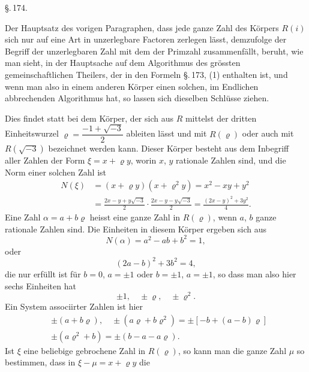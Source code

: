 
\begin{center}
\S.\,174.

\end{center}

Der Hauptsatz des vorigen Paragraphen, dass jede ganze Zahl des K\"orpers $R(i)$ sich nur auf eine Art in unzerlegbare Factoren zerlegen l\"asst, demzufolge der Begriff der unzerlegbaren Zahl mit dem der Primzahl zusammenf\"allt, beruht, wie man sieht, in der Hauptsache auf dem Algorithmus des gr\"ossten gemeinschaftlichen Theilers, der in den Formeln \S.\,173, (1) enthalten ist, und wenn man also in einem anderen K\"orper einen solchen, im Endlichen abbrechenden Algorithmus hat, so lassen sich dieselben Schl\"usse ziehen.

Dies findet statt bei dem K\"orper, der sich aus $R$ mittelst der dritten Einheitswurzel $\varrho = \dfrac{-1+\sqrt{-3}}{2}$ ableiten l\"asst und mit $R(\varrho)$ oder auch mit $R(\sqrt{-3})$ bezeichnet werden kann. Dieser K\"orper besteht aus dem Inbegriff aller Zahlen der Form $\xi = x+\varrho y$, worin $x$, $y$ rationale Zahlen sind, und die Norm einer solchen Zahl ist
\[
\begin{aligned}
N(\xi) &= (x+\varrho y)(x+\varrho^2 y) = x^2 - xy + y^2\\
&= \frac{2x-y+y\sqrt{-3}}{2}\cdot\frac{2x-y-y\sqrt{-3}}{2} = \frac{(2x-y)^2+3y^2}{4}.
\end{aligned}
\]
Eine Zahl $\alpha = a+b\varrho$ heisst eine ganze Zahl in $R(\varrho)$, wenn $a$, $b$ ganze rationale Zahlen sind. Die Einheiten in diesem K\"orper ergeben sich aus
\[
N(\alpha) = a^2 - ab + b^2 = 1,
\]
oder
\[
(2a-b)^2 + 3b^2 = 4,
\]
die nur erf\"ullt ist f\"ur $b=0$, $a=\pm 1$ oder $b=\pm 1$, $a=\pm 1$, so dass man also hier sechs Einheiten hat
\[
\pm 1,\quad \pm\varrho,\quad \pm\varrho^2.
\]
Ein System associirter Zahlen ist hier
\[
\begin{aligned}
&\pm(a+b\varrho),\quad \pm(a\varrho+b\varrho^2) = \pm[-b+(a-b)\varrho]\\
&\pm(a\varrho^2+b) = \pm(b-a-a\varrho).
\end{aligned}
\]
Ist $\xi$ eine beliebige gebrochene Zahl in $R(\varrho)$, so kann man die ganze Zahl $\mu$ so bestimmen, dass in $\xi-\mu = x+\varrho y$ die
